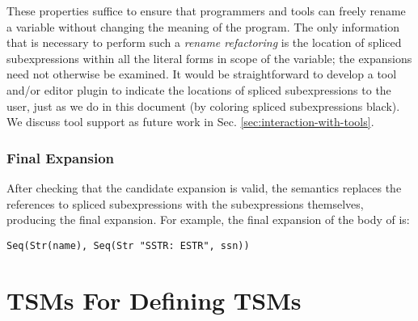 These properties suffice to ensure that programmers and tools can freely rename a variable without changing the meaning of the program. The only information that is necessary to perform such a \emph{rename refactoring} is the location of spliced subexpressions within all the literal forms in scope of the variable; the expansions need not otherwise be examined. It would be straightforward to develop a tool and/or editor plugin to indicate the locations of spliced subexpressions to the user, just as we do in this document (by coloring spliced subexpressions black). We discuss tool support as future work in Sec. \ref{sec:interaction-with-tools}.


\subsubsection{Final Expansion}
After checking that the candidate expansion is {valid}, the semantics replaces the references to spliced subexpressions with the subexpressions themselves, producing the final expansion. For example, the final expansion of the body of  is:
\begin{lstlisting}[numbers=none]
Seq(Str(name), Seq(Str "SSTR: ESTR", ssn))
\end{lstlisting}


\section{TSMs For Defining TSMs}\label{sec:tsms-for-tsms}
